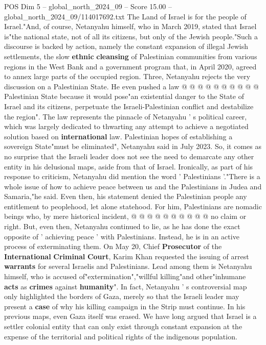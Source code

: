 \begin{textsample}{POS Dim 5 – global\_north\_2024\_09 – Score 15.00 – global\_north\_2024\_09/114017692.txt}
The Land of Israel is for the people of Israel."And, of course, Netanyahu himself, who in March 2019, stated that Israel is"the national state, not of all its citizens, but only of the Jewish people."Such a discourse is backed by action, namely the constant expansion of illegal Jewish settlements, the slow \textbf{ethnic} \textbf{cleansing} of Palestinian communities from various regions in the West Bank and a government program that, in April 2020, agreed to annex large parts of the occupied region.
Three, Netanyahu rejects the very discussion on a Palestinian State.
He even pushed a law @ @ @ @ @ @ @ @ @ @ Palestinian State because it would pose"an existential danger to the State of Israel and its citizens, perpetuate the Israeli-Palestinian conflict and destabilize the region".
The law represents the pinnacle of Netanyahu ' s political career, which was largely dedicated to thwarting any attempt to achieve a negotiated solution based on \textbf{international} law.
Palestinian hopes of establishing a sovereign State"must be eliminated", Netanyahu said in July 2023.
So, it comes as no surprise that the Israeli leader does not see the need to demarcate any other entity in his delusional maps, aside from that of Israel.
Ironically, as part of his response to criticism, Netanyahu did mention the word ' Palestinians '."There is a whole issue of how to achieve peace between us and the Palestinians in Judea and Samaria,"he said.
Even then, his statement denied the Palestinian people any entitlement to peoplehood, let alone statehood.
For him, Palestinians are nomadic beings who, by mere historical incident, @ @ @ @ @ @ @ @ @ @ no claim or right.
But, even then, Netanyahu continued to lie, as he has done the exact opposite of ' achieving peace ' with Palestinians.
Instead, he is in an active process of exterminating them.
On May 20, Chief \textbf{Prosecutor} of the \textbf{International} \textbf{Criminal} \textbf{Court}, Karim Khan requested the issuing of arrest \textbf{warrants} for several Israelis and Palestinians.
Lead among them is Netanyahu himself, who is accused of"extermination","willful killing"and other"inhumane \textbf{acts} as \textbf{crimes} against \textbf{humanity}".
In fact, Netanyahu ' s controversial map only highlighted the borders of Gaza, merely so that the Israeli leader may present a \textbf{case} of why his killing campaign in the Strip must continue.
In his previous maps, even Gaza itself was erased.
We have long argued that Israel is a settler colonial entity that can only exist through constant expansion at the expense of the territorial and political rights of the indigenous population.

\end{textsample}
